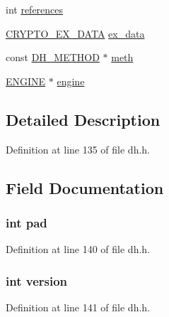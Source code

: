 \begin{DoxyCompactItemize}
\item 
int \hyperlink{structdh__st_a146fdb34d9a909e530adf8b189481195}{references}
\item 
\hyperlink{crypto_2ossl__typ_8h_a7eaff1c18057495d8af18f22d1370b51}{C\+R\+Y\+P\+T\+O\+\_\+\+E\+X\+\_\+\+D\+A\+TA} \hyperlink{structdh__st_ac3e4fd59d6ee44a81f3a58114613c1e2}{ex\+\_\+data}
\item 
const \hyperlink{crypto_2ossl__typ_8h_a5cc1db56c9b2f76075c0878f65e9b46d}{D\+H\+\_\+\+M\+E\+T\+H\+OD} $\ast$ \hyperlink{structdh__st_a835ecfca8492f404b4c94f6ecf02d7e4}{meth}
\item 
\hyperlink{crypto_2ossl__typ_8h_abac45b251498719318e60ab8d6192510}{E\+N\+G\+I\+NE} $\ast$ \hyperlink{structdh__st_ae4bca26806adfdaf8a28463c98ddf03a}{engine}
\end{DoxyCompactItemize}


\subsection{Detailed Description}


Definition at line 135 of file dh.\+h.



\subsection{Field Documentation}
\subsubsection[{\texorpdfstring{pad}{pad}}]{\setlength{\rightskip}{0pt plus 5cm}int pad}\hypertarget{structdh__st_af1d40a330bc745f51d8b079c9dc473ff}{}\label{structdh__st_af1d40a330bc745f51d8b079c9dc473ff}


Definition at line 140 of file dh.\+h.

\subsubsection[{\texorpdfstring{version}{version}}]{\setlength{\rightskip}{0pt plus 5cm}int version}\hypertarget{structdh__st_aad880fc4455c253781e8968f2239d56f}{}\label{structdh__st_aad880fc4455c253781e8968f2239d56f}


Definition at line 141 of file dh.\+h.

